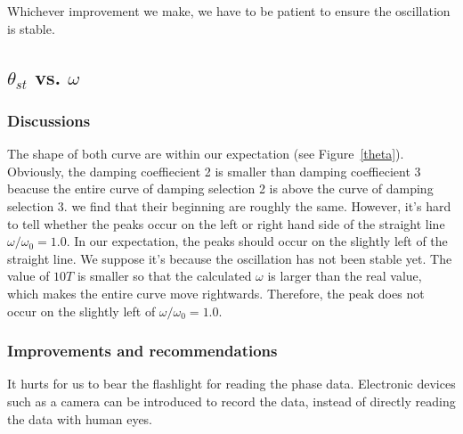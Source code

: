 Whichever improvement we make, we have to be patient to ensure the oscillation
is stable. 

\subsection{$\theta_{st}$ vs. $\omega$}

\subsubsection{Discussions}

The shape of both curve are within our expectation (see Figure~\ref{theta}).
Obviously, the damping coeffiecient 2 is smaller than damping coeffiecient 3
beacuse the entire curve of damping selection 2 is above the curve of damping
selection 3. we find that their beginning are roughly the same. However, it's
hard to tell whether the peaks occur on the left or right hand side of the
straight line $\omega/\omega_0=1.0$. In our expectation, the peaks should occur
on the slightly left of the straight line. We suppose it's because the
oscillation has not been stable yet. The value of $10T$ is smaller so that the
calculated $\omega$ is larger than the real value, which makes the entire curve
move rightwards. Therefore, the peak does not occur on the slightly left of
$\omega/\omega_0=1.0$. 


\subsubsection{Improvements and recommendations}

It hurts for us to bear the flashlight for reading the phase data. Electronic
devices such as a camera can be introduced to record the data, instead of
directly reading the data with human eyes.